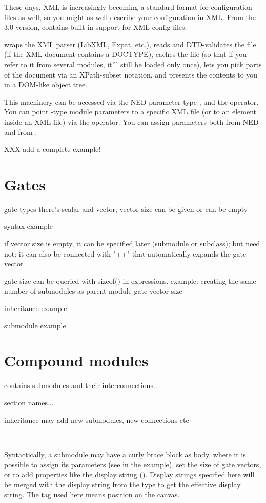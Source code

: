 These days, XML is increasingly becoming a standard format for configuration
files as well, so you might as well describe your configuration in XML.
From the 3.0 version, {\opp} contains built-in support for XML config files.

{\opp} wraps the XML parser (LibXML, Expat, etc.), reads and DTD-validates
the file (if the XML document contains a DOCTYPE), caches the file
(so that if you refer to it from several modules, it'll still be loaded
only once), lets you pick parts of the document via an XPath-subset notation,
and presents the contents to you in a DOM-like object tree.

This machinery can be accessed via the NED parameter type , and the
 operator. You can point -type module parameters
to a specific XML file (or to an element inside an XML file) via the
 operator. You can assign  parameters both from NED
and from .

XXX add a complete example!


\section{Gates}

gate types
there's scalar and vector; vector size can be given or can be empty

syntax example

if vector size is empty, it can be specified later (submodule or subclass);
but need not: it can also be connected with "++" that automatically expands
the gate vector

gate size can be queried with sizeof() in expressions. example: creating the
same number of submodules as parent module gate vector size

inheritance example

submodule example




\section{Compound modules}

contains submodules and their interconnections...

section names...

inheritance may add new submodules, new connections etc

----

Syntactically, a submodule may have a curly brace block as body, where
it is possible to assign its parameters (see  in the example),
set the size of gate vectors, or to add properties like the display string
(). Display strings specified here will be merged with the
display string from the type to get the effective display string.
The  tag used here means position on the canvas.

